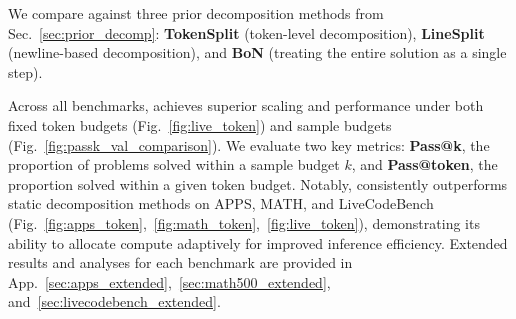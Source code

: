We compare \decomp against three prior decomposition methods from Sec.~\ref{sec:prior_decomp}: \textbf{TokenSplit} (token-level decomposition), \textbf{LineSplit} (newline-based decomposition), and \textbf{BoN} (treating the entire solution as a single step). 

Across all benchmarks, \decomp achieves superior scaling and performance under both fixed token budgets (Fig.~\ref{fig:live_token}) and sample budgets (Fig.~\ref{fig:passk_val_comparison}). We evaluate two key metrics: \textbf{Pass@k}, the proportion of problems solved within a sample budget $k$, and \textbf{Pass@token}, the proportion solved within a given token budget. 
Notably, \decomp consistently outperforms static decomposition methods on APPS, MATH, and LiveCodeBench (Fig.~\ref{fig:apps_token},~\ref{fig:math_token},~\ref{fig:live_token}), demonstrating its ability to allocate compute adaptively for improved inference efficiency. Extended results and analyses for each benchmark are provided in App.~\ref{sec:apps_extended},~\ref{sec:math500_extended}, and~\ref{sec:livecodebench_extended}.  








